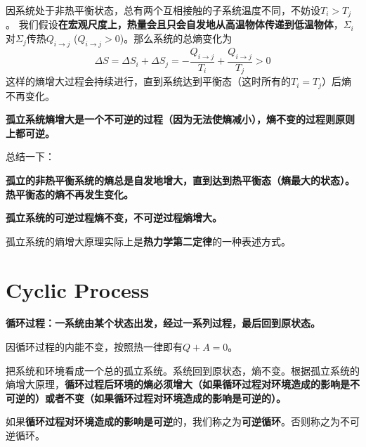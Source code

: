 \documentclass[CJK]{beamer}
\begin{document}
\begin{frame}
\bch
因系统处于非热平衡状态，总有两个互相接触的子系统温度不同，不妨设$T_i>T_j$。
我们假设{\bf 在宏观尺度上，热量会且只会自发地从高温物体传递到低温物体}，$\Sigma_i$对$\Sigma_j$传热$Q_{i\rightarrow j}$ ($Q_{i\rightarrow j}>0$)。那么系统的总熵变化为
$$\Delta S = \Delta S_i + \Delta S_j = - \frac{Q_{i\rightarrow j}}{T_i}+ \frac{Q_{i\rightarrow j}}{T_j}  > 0$$
这样的熵增大过程会持续进行，直到系统达到平衡态（这时所有的$T_i = T_j$）后熵不再变化。

{\bf 孤立系统熵增大是一个不可逆的过程（因为无法使熵减小），熵不变的过程则原则上都可逆。}

\ech
\end{frame}

\begin{frame}
\bch
总结一下：

\bitem
\item{\bf 孤立的非热平衡系统的熵总是自发地增大，直到达到热平衡态（熵最大的状态）。热平衡态的熵不再发生变化。}
\item{\bf 孤立系统的可逆过程熵不变，不可逆过程熵增大。}
\eitem

孤立系统的熵增大原理实际上是{\bf 热力学第二定律}的一种表述方式。

\ech
\end{frame}


\section{Cyclic Process}

\begin{frame}
\bch
{}
\ech
\end{frame}

\begin{frame}
\bch
{\bf 循环过程：一系统由某个状态出发，经过一系列过程，最后回到原状态。}

\skiplines
\bitem
\item{因循环过程的内能不变，按照热一律即有$Q+A = 0$。}
\item{把系统和环境看成一个总的孤立系统。系统回到原状态，熵不变。根据孤立系统的熵增大原理，{\bf 循环过程后环境的熵必须增大（如果循环过程对环境造成的影响是不可逆的）或者不变（如果循环过程对环境造成的影响是可逆的）。}}
\eitem

如果{\bf 循环过程对环境造成的影响是可逆}的，我们称之为{\bf 可逆循环}。否则称之为不可逆循环。

\ech
\end{frame}
\end{document}
